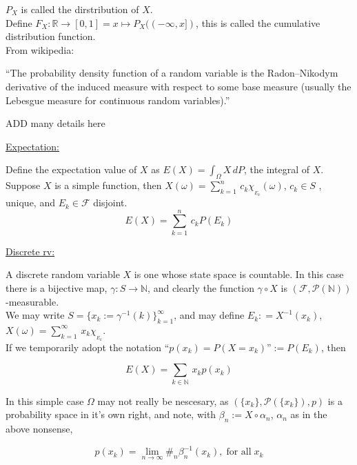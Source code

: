 \documentclass[12pt]{article}
\newcommand{\pset}[1]{ \mathcal{P}(#1) }
\newcommand{\rarw}[0] { \rightarrow }
\newcommand{\nats}[0] { \mathbb{N}}
\newcommand{\reals}[0] { \mathbb{R}}
\newcommand{\om}[0] { \omega }
\newcommand{\Om}[0] { \Omega }
\newcommand{\F}[0] { \mathcal{F} }
\begin{document}
$P_X$ is called the dirstribution of $X$. \\

Define $F_X : \reals \rarw [0,1] = x \mapsto P_X((-\infty,x])$, this is called the cumulative distribution function.\\

From wikipedia:

``The probability density function of a random variable is the Radon–Nikodym derivative of the induced measure with respect to some base measure (usually the Lebesgue measure for continuous random variables).''

ADD many details here



\begin{flushleft}
\underline{Expectation:}
\end{flushleft}

Define the expectation value of $X$ as $E(X) = \int_{\Om} X \, dP$, the integral of $X$.\\

Suppose $X$ is a simple function, then $X(\om) = \sum_{k=1}^n \, c_k \chi_{_{E_k}} (\om)$, $c_k \in S$ , unique, and $E_k \in \F$ disjoint.\\

$$
	E(X) =  \sum_{k=1}^n \, c_k P(E_k)
$$

\begin{flushleft}
\underline{Discrete rv:}
\end{flushleft}

A discrete random variable $X$ is one whose state space is countable. In this case there is a bijective map, $\gamma : S \rarw \nats$, and clearly the function $\gamma \circ X	$ is $( \F, \pset{\nats} )$-measurable. \\ We may write $S = \{ x_k := \gamma^{-1}(k) \}_{k=1}^\infty$, and may define $E_k :	= X^{-1}(x_k)$, $X(\omega) = \sum_{k=1}^\infty \, x_k \chi_{_{E_k}} $. \\ If we temporarily adopt the notation ``$p(x_k) = P(X = x_k)$''$ := P(E_k)$, then


$$
	E(X) =  \sum_{k \in \nats} \, x_k p(x_k)
$$

In this simple case $\Om$ may not really be nescesary, as $( \{x_k \}, \pset{\{x_k\}}, p)$ is a probability space in it's own right, and note, with $\beta_n := X \circ \alpha_n$, $\alpha_n$ as in the above nonsense,

$$
	p(x_k) = \lim_{n \rarw \infty} \#_n \beta_n^{-1} ( x_k ), \; \textrm{for all} \; x_k
$$
\end{document}
